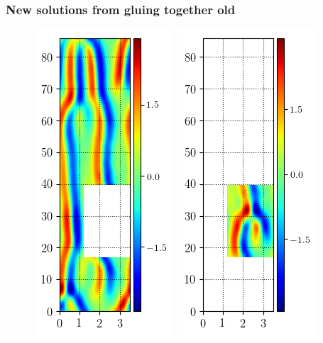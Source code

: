 \documentclass[mathserif, handout]{beamer}
\begin{document}
\begin{frame}
\frametitle{New solutions from gluing together old}
\begin{figure}
\includegraphics[width=.3\textwidth,height=.4\textheight]{MNG_ppo_without_HalfD}
\includegraphics[width=.3\textwidth,height=.4\textheight]{MNG_ppo_subdomain_HalfD}
\end{figure}
\end{frame}
\end{document}
